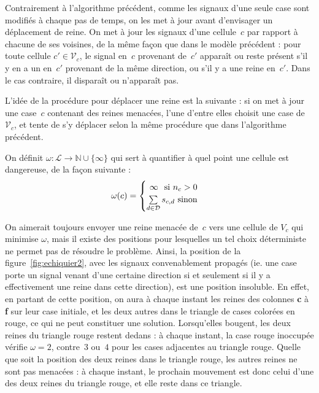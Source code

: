 \documentclass[11pt, openany, a4paper]{article}
\newcommand{\N}{\mathbb{N}}
\newcommand{\La}{\mathcal{L}}
\newcommand{\D}{\mathcal{D}}
\newcommand{\E}{\mathcal{E}}
\newcommand{\V}{\mathcal V}
\begin{document}

\bigskip

Contrairement à l'algorithme précédent, comme les signaux d'une seule case sont modifiés à chaque pas de temps, on les met à jour avant d'envisager un déplacement de reine. On met à jour les signaux d'une cellule~$c$ par rapport à chacune de ses voisines, de la même façon que dans le modèle précédent : pour toute cellule $c'\in\V_c$, le signal en~$c$ provenant de~$c'$ apparaît ou reste présent s'il y en a un en~$c'$ provenant de la même direction, ou s'il y a une reine en~$c'$. Dans le cas contraire, il disparaît ou n'apparaît pas.
\bigskip

L'idée de la procédure pour déplacer une reine est la suivante : si on met à jour une case~$c$ contenant des reines menacées, l'une d'entre elles choisit une case de $\V_c$, et tente de s'y déplacer selon la même procédure que dans l'algorithme précédent. 

On définit $\omega : \La\to\N\cup\{\infty\}$ qui sert à quantifier à quel point une cellule est dangereuse, de la façon suivante : \[
\omega(c) = 
\begin{cases}
  \hfill \infty \hfill \text{ si $n_c > 0$}\\
  \hfill \sum\limits_{d\in\D}s_{c,d} \hfill \text{ sinon}
\end{cases}
\]

On aimerait toujours envoyer une reine menacée de~$c$ vers une cellule de $V_c$ qui minimise $\omega$, mais il existe des positions pour lesquelles un tel choix déterministe ne permet pas de résoudre le problème. Ainsi, la position de la figure~\ref{fig:echiquier2}, avec les signaux convenablement propagés (ie. une case porte un signal venant d'une certaine direction si et seulement si il y a effectivement une reine dans cette direction), est une position insoluble. En effet, en partant de cette position, on aura à chaque instant les reines des colonnes \textbf c à \textbf f sur leur case initiale, et les deux autres dans le triangle de cases colorées en rouge, ce qui ne peut constituer une solution. 
Lorsqu'elles bougent, les deux reines du triangle rouge restent dedans : à chaque instant, la case rouge inoccupée vérifie $\omega = 2$, contre~$3$ ou~$4$ pour les cases adjacentes au triangle rouge. Quelle que soit la position des deux reines dans le triangle rouge, les autres reines ne sont pas menacées : à chaque instant, le prochain mouvement est donc celui d'une des deux reines du triangle rouge, et elle reste dans ce triangle.
\end{document}
